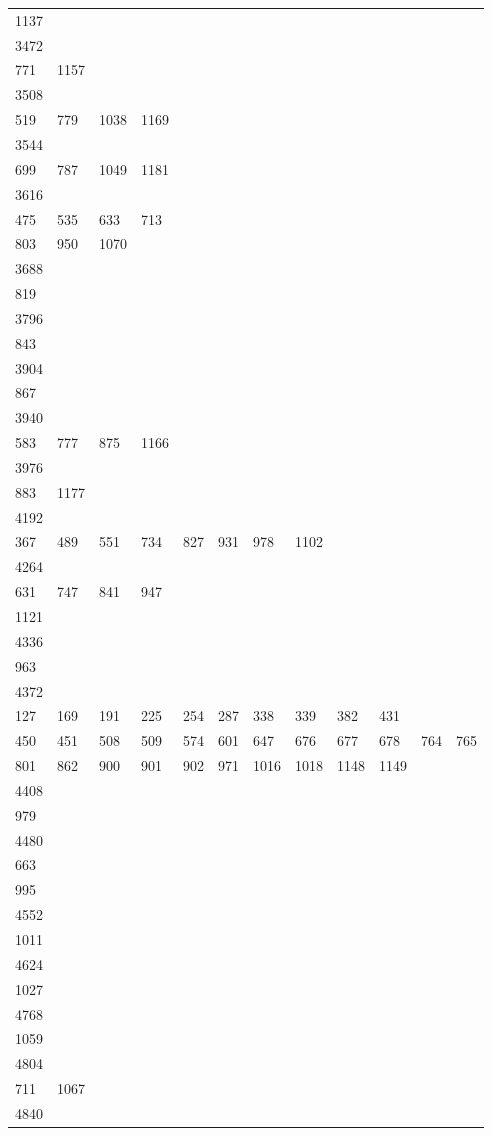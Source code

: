 \begin{longtable}{llllllllllll}
1137& \\
3472&&&&&&&&&&&\\
771& 1157\\
3508&&&&&&&&&&&\\
519& 779& 1038& 1169& \\
3544&&&&&&&&&&&\\
699& 787& 1049& 1181& \\
3616&&&&&&&&&&&\\
475& 535& 633& 713\\
803& 950& 1070& \\
3688&&&&&&&&&&&\\
819& \\
3796&&&&&&&&&&&\\
843& \\
3904&&&&&&&&&&&\\
867& \\
3940&&&&&&&&&&&\\
583& 777& 875& 1166& \\
3976&&&&&&&&&&&\\
883& 1177\\
4192&&&&&&&&&&&\\
367& 489& 551& 734& 827& 931& 978& 1102& \\
4264&&&&&&&&&&&\\
631& 747& 841& 947\\
1121& \\
4336&&&&&&&&&&&\\
963& \\
4372&&&&&&&&&&&\\
127& 169& 191& 225& 254& 287& 338& 339& 382& 431\\
450& 451& 508& 509& 574& 601& 647& 676& 677& 678& 764& 765\\
801& 862& 900& 901& 902& 971& 1016& 1018& 1148& 1149& \\
4408&&&&&&&&&&&\\
979& \\
4480&&&&&&&&&&&\\
663\\
995& \\
4552&&&&&&&&&&&\\
1011& \\
4624&&&&&&&&&&&\\
1027& \\
4768&&&&&&&&&&&\\
1059& \\
4804&&&&&&&&&&&\\
711& 1067& \\
4840&&&&&&&&&&&\\

\end{longtable}
